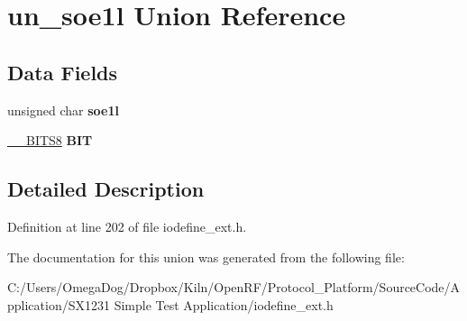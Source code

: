 \hypertarget{unionun__soe1l}{\section{un\-\_\-soe1l Union Reference}
\label{unionun__soe1l}
}
\subsection*{Data Fields}
\begin{DoxyCompactItemize}
\item 
\hypertarget{unionun__soe1l_acecea5eeeba1ce8eda3ee4f258120ff2}{unsigned char {\bfseries soe1l}}\label{unionun__soe1l_acecea5eeeba1ce8eda3ee4f258120ff2}

\item 
\hypertarget{unionun__soe1l_a14e6429f081f8b8969bad5e34ef54334}{\hyperlink{struct_____b_i_t_s8}{\-\_\-\-\_\-\-B\-I\-T\-S8} {\bfseries B\-I\-T}}\label{unionun__soe1l_a14e6429f081f8b8969bad5e34ef54334}

\end{DoxyCompactItemize}


\subsection{Detailed Description}


Definition at line 202 of file iodefine\-\_\-ext.\-h.



The documentation for this union was generated from the following file\-:\begin{DoxyCompactItemize}
\item 
C\-:/\-Users/\-Omega\-Dog/\-Dropbox/\-Kiln/\-Open\-R\-F/\-Protocol\-\_\-\-Platform/\-Source\-Code/\-Application/\-S\-X1231 Simple Test Application/iodefine\-\_\-ext.\-h\end{DoxyCompactItemize}
